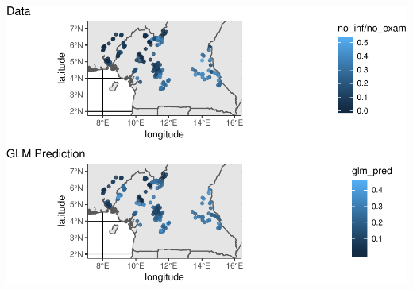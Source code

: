 \documentclass[11pt,ignorenonframetext,]{beamer}
\begin{document}
\begin{frame}{}
\protect\hypertarget{section}{}

\begin{center}\includegraphics[width=\textwidth]{Lec20_files/figure-beamer/unnamed-chunk-8-1} \end{center}

\end{frame}
\end{document}
